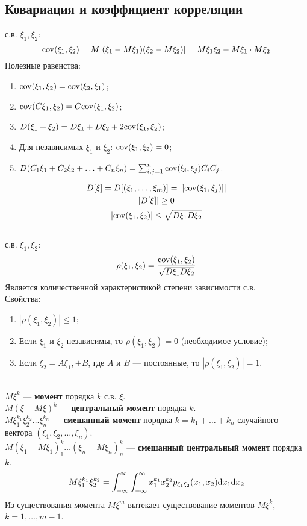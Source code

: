 \subsection{Ковариация и коэффициент корреляции}
 с.в. $\xi_1, \xi_2$:
\begin{equation*}
    \mathrm{cov}(\xi_1, \xi_2) = M[(\xi_1 - M\xi_1)(\xi_2 - M\xi_2)] = M\xi_1\xi_2 - M\xi_1 \cdot M\xi_2
\end{equation*}
Полезные равенства:
\begin{enumerate}
    \item $\mathrm{cov}(\xi_1, \xi_2) = \mathrm{cov}(\xi_2, \xi_1)$;
    \item $\mathrm{cov}(C\xi_1, \xi_2) = C\mathrm{cov}(\xi_1, \xi_2)$;
    \item $D(\xi_1 + \xi_2) = D\xi_1 + D\xi_2 + 2\mathrm{cov}(\xi_1, \xi_2)$;
    \item Для независимых $\xi_1$ и $\xi_2$: $\mathrm{cov}(\xi_1, \xi_2) = 0$;
    \item $D(C_1\xi_1 + C_2\xi_2 + \ldots + C_n\xi_n) = \sum_{i, j = 1}^n \mathrm{cov}(\xi_i, \xi_j) C_i C_j$.
\end{enumerate}
\begin{gather*}
    D[\xi] = D[(\xi_1, \ldots, \xi_m)] = ||\mathrm{cov}(\xi_1, \xi_j)||\\
    |D[\xi]| \ge 0\\
    |\mathrm{cov}(\xi_1, \xi_2)| \le \sqrt{D\xi_1 D\xi_2}
\end{gather*}
\\
 с.в. $\xi_1, \xi_2$:
\begin{equation*}
    \rho(\xi_1, \xi_2) = \frac{\mathrm{cov}(\xi_1, \xi_2)}{\sqrt{D\xi_1 D\xi_2}}
\end{equation*}
Является количественной характеристикой степени зависимости с.в.\\
Свойства:
\begin{enumerate}
    \item $|\rho(\xi_1, \xi_2)| \le 1$;
    \item Если $\xi_1$ и $\xi_2$ независимы, то $\rho(\xi_1, \xi_2) = 0$ (необходимое условие);
    \item Если $\xi_2 = A\xi_1, + B$, где $A$ и $B$ --- постоянные, то $|\rho(\xi_1, \xi_2)| = 1$.
\end{enumerate}
\ \\
$M\xi^k$ --- \textbf{момент} порядка $k$ с.в. $\xi$.\\
$M(\xi - M\xi)^k$ --- \textbf{центральный момент} порядка $k$.\\
$M \xi_1^{k_1} \xi_2^{k_2} \ldots \xi_n^{k_n}$ --- \textbf{смешанный момент} порядка $k = k_1 + \ldots + k_n$
случайного вектора $(\xi_1, \xi_2, \ldots, \xi_n)$.\\
$M (\xi_1 - M\xi_1)^k_1 \ldots (\xi_n - M\xi_n)^k_n$ --- \textbf{смешанный центральный момент} порядка $k$.
\begin{equation*}
    M \xi_1^{k_1} \xi_2^{k_2} =
    \int_{-\infty}^\infty \int_{-\infty}^\infty x_1^{k_1} x_2^{k_2} p_{\xi_1 \xi_2} (x_1, x_2) \mathrm{d}{x_1} \mathrm{d}{x_2}
\end{equation*}
Из существования момента $M\xi^m$ вытекает существование моментов $M\xi^k$, $k = 1, \ldots, m - 1$.

